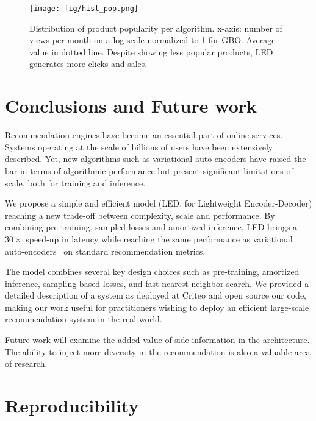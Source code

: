 \documentclass[sigconf]{acmart}
\begin{document}
\begin{figure}[h]
    \centering
    \texttt{[image: fig/hist\_pop.png]}
    \caption{Distribution of product popularity per algorithm. x-axis: number of views per month on a log scale normalized to 1 for GBO. Average value in dotted line. Despite showing less popular products, LED generates more clicks and sales.}
    \label{fig:histogram-popularity}
\end{figure}




\section{Conclusions and Future work}

Recommendation engines have become an essential part of online services. Systems operating at the scale of billions of users have been extensively described. Yet, new algorithms such as variational auto-encoders have raised the bar in terms of algorithmic performance but present significant limitations of scale, both for training and inference.

We propose a simple and efficient model (LED, for Lightweight Encoder-Decoder) reaching a new trade-off between complexity, scale and performance. By combining pre-training, sampled losses and amortized inference, LED brings a $30\times$ speed-up in latency while reaching the same performance as variational auto-encoders~\cite{variational-liang-2018} on standard recommendation metrics.

The model combines several key design choices such as pre-training, amortized inference, sampling-based losses, and fast nearest-neighbor search. We provided a detailed description of a system as deployed at Criteo and open source our code, making our work useful for practitioners wishing to deploy an efficient large-scale recommendation system in the real-world. 

Future work will examine the added value of side information in the architecture. The ability to inject more diversity in the recommendation is also a valuable area of research.






\newpage
\section{Reproducibility}
\end{document}
